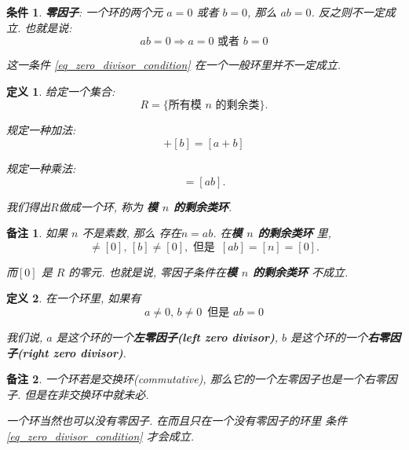 \documentclass[utf8]{ctexbook}
\newtheorem{definition}{定义}[section]
\newtheorem{memo}{备注}[section]
\newtheorem{condition}{条件}[section]
\begin{document}
\begin{condition}
\textbf{零因子}: 一个环的两个元 $a = 0$ 或者 $b = 0$, 那么 $ab = 0$. 反之则不一定成立. 也就是说:
\begin{equation}
ab = 0 \Rightarrow a=0 \mbox{ 或者 } b=0 \label{eq_zero_divisor_condition}
\end{equation}

这一条件 \ref{eq_zero_divisor_condition} 在一个一般环里并不一定成立.
\end{condition}

\begin{definition}
给定一个集合:
\begin{equation}
R = \{ \mbox{所有模 $n$ 的剩余类} \}.
\end{equation}

规定一种加法:
\begin{equation}
[a] + [b] = [a+b]
\end{equation}

规定一种乘法:
\begin{equation}
[a][b] = [ab] .
\end{equation}

我们得出$R$做成一个环, 称为 \textbf{模 $n$ 的剩余类环}.

\end{definition}

\begin{memo}
如果 $n$ 不是素数, 那么 存在$n = ab$. 在\textbf{模 $n$ 的剩余类环} 里,
\begin{equation}
[a] \neq [0], \, [b] \neq [0], \mbox{ 但是 } \, [ab] = [n] = [0].
\end{equation}

而$[0]$ 是 $R$ 的零元. 也就是说, 零因子条件在\textbf{模 $n$ 的剩余类环} 不成立.


\end{memo}


\begin{definition}
在一个环里, 如果有
\begin{equation}
a \neq 0,\, b \neq 0 \, \mbox{  但是  }  ab = 0
\end{equation}

我们说, $a$ 是这个环的一个\textbf{左零因子(left zero divisor)}, $b$ 是这个环的一个\textbf{右零因子(right zero divisor)}.

\end{definition}


\begin{memo}
一个环若是交换环(commutative), 那么它的一个左零因子也是一个右零因子. 但是在非交换环中就未必.

一个环当然也可以没有零因子. 在而且只在一个没有零因子的环里 条件 \ref{eq_zero_divisor_condition} 才会成立. 
\end{memo}
\end{document}
